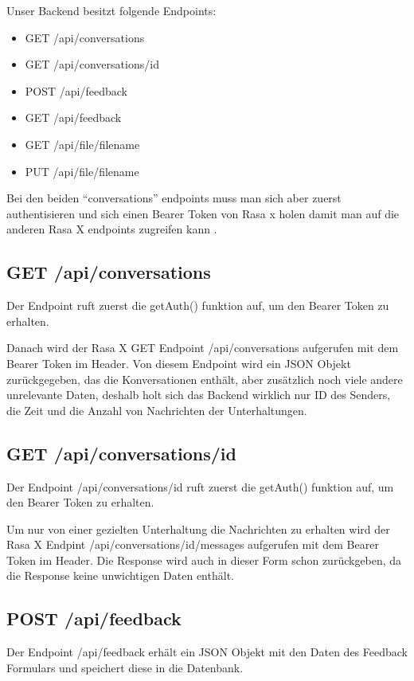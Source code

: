 Unser Backend besitzt folgende Endpoints:

\begin{itemize}
    \item GET /api/conversations
    \item GET /api/conversations/{id}
    \item POST /api/feedback
    \item GET /api/feedback
    \item GET /api/file/{filename}
    \item PUT /api/file/{filename}
\end{itemize}

Bei den beiden ``conversations'' endpoints muss man sich aber zuerst authentisieren und sich einen Bearer Token von Rasa x holen damit man auf die anderen Rasa X endpoints zugreifen kann .

\subsection{GET /api/conversations}
Der Endpoint ruft zuerst die getAuth() funktion auf, um den Bearer Token zu erhalten.

Danach wird der Rasa X GET Endpoint /api/conversations aufgerufen mit dem Bearer Token im Header.
Von diesem Endpoint wird ein JSON Objekt zurückgegeben, das die Konversationen enthält, aber zusätzlich noch viele andere unrelevante Daten, deshalb holt sich das Backend wirklich nur ID des Senders, die Zeit und die Anzahl von Nachrichten der Unterhaltungen.

\subsection{GET /api/conversations/{id}}
Der Endpoint /api/conversations/{id} ruft zuerst die getAuth() funktion auf, um den Bearer Token zu erhalten.

Um nur von einer gezielten Unterhaltung die Nachrichten zu erhalten wird der Rasa X Endpint /api/conversations/{id}/messages aufgerufen mit dem Bearer Token im Header.
Die Response wird auch in dieser Form schon zurückgeben, da die Response keine unwichtigen Daten enthält.

\subsection{POST /api/feedback}
Der Endpoint /api/feedback erhält ein JSON Objekt mit den Daten des Feedback Formulars und speichert diese in die Datenbank.

